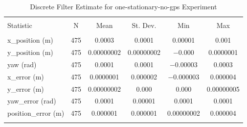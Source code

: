 
\begin{table}[htbp] \centering 
  \caption{Discrete Filter Estimate for one-stationary-no-gps Experiment} 
  \label{tab:one_stationary_no_gps_discrete_summary} 
\begin{tabular}{@{\extracolsep{5pt}}lccccc} 
\\[-1.8ex]\hline 
\hline \\[-1.8ex] 
Statistic & \multicolumn{1}{c}{N} & \multicolumn{1}{c}{Mean} & \multicolumn{1}{c}{St. Dev.} & \multicolumn{1}{c}{Min} & \multicolumn{1}{c}{Max} \\ 
\hline \\[-1.8ex] 
x\_position (m) & 475 & \num{0.0003} & \num{0.0001} & \num{0.00001} & \num{0.001} \\ 
y\_position (m) & 475 & \num{0.00000002} & \num{0.00000002} & \num{-0.000} & \num{0.0000001} \\ 
yaw (rad) & 475 & \num{0.0001} & \num{0.0001} & \num{-0.00003} & \num{0.0003} \\ 
x\_error (m) & 475 & \num{0.0000001} & \num{0.000002} & \num{-0.000003} & \num{0.000004} \\ 
y\_error (m) & 475 & \num{0.00000002} & \num{0.000} & \num{0.000} & \num{0.00000005} \\ 
yaw\_error (rad) & 475 & \num{0.0001} & \num{0.00001} & \num{0.0001} & \num{0.0001} \\ 
position\_error (m) & 475 & \num{0.000001} & \num{0.000001} & \num{0.00000002} & \num{0.000004} \\ 
\hline \\[-1.8ex] 
\end{tabular} 
\end{table} 
